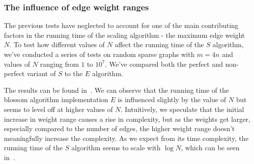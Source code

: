 \subsubsection*{The influence of edge weight ranges}

The previous tests have neglected to account for one of the main contributing factors in the running time of the scaling algorithm - the maximum edge weight $N$. To test how different values of $N$ affect the running time of the $S$ algorithm, we've conducted a series of tests on random sparse graphs with $m = 4n$ and values of $N$ ranging from $1$ to $10^7$. We've compared both the perfect and non-perfect variant of $S$ to the $E$ algorithm. 

The results can be found in~. We can observe that the running time of the blossom algorithm implementation $E$ is influenced slightly by the value of $N$ but seems to level off at higher values of $N$. Intuitively, we speculate that the initial increase in weight range causes a rise in complexity, but as the weights get larger, especially compared to the number of edges, the higher weight range doesn't meaningfully increase the complexity. As we expect from its time complexity, the running time of the $S$ algorithm seems to scale with $\log N$, which can be seen in~.

